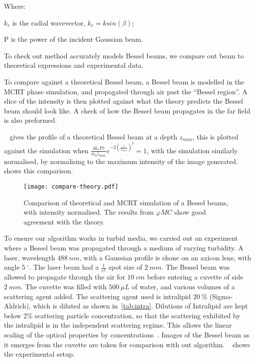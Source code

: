 \noindent Where:

    \indent $k_r$ is the radial wavevector, $k_r=k sin(\beta)$;

    \indent P is the power of the incident Gaussian beam.

    \medskip

To check out method accurately models Bessel beams, we compare out beam to theoretical expressions and experimental data.

To compare against a theoretical Bessel beam, a Bessel beam is modelled in the MCRT phase simulation, and propagated through air past the ``Bessel region''. 
A slice of the intensity is then plotted against what the theory predicts the Bessel beam should look like. 
A check of how the Bessel beam propagates in the far field is also preformed.


~ gives the profile of a theoretical Bessel beam at a depth $z_{max}$, this is plotted against the simulation when $\tfrac{4k_rPz}{w_0z_{max}}e^{-2\left(\tfrac{z}{z_{max}}\right)^2}=1$, with the simulation similarly normalised, by normalising to the maximum intensity of the image generated. ~ shows this comparison.


\begin{figure}[!ht]
    \centering
    \texttt{[image: compare-theory.pdf]}
    \caption{Comparison of theoretical and MCRT simulation of a Bessel beams, with intensity normalised. The results from $\varphi MC$ show good agreement with the theory.}
    \label{fig:besselCompare}
\end{figure}

To ensure our algorithm works in turbid media, we carried out an experiment where a Bessel beam was propagated through a medium of varying turbidity.
A laser, wavelength $488~nm$, with a Gaussian profile is shone on an axicon lens, with angle $5~^{\circ}$.
The laser beam had a $\tfrac{1}{e^2}$ spot size of $2~mm$. 
The Bessel beam was allowed to propagate through the air for $10~cm$ before entering a cuvette of side $2~mm$.
The cuvette was filled with $500~\mu L$ of water, and various volumes of a scattering agent added.
The scattering agent used is intralipid $20~\%$ (Sigma-Aldrich), which is diluted as shown in~\cref{tab:intra}.
Dilutions of Intralipid are kept below 2\% scattering particle concentration, so that the scattering exhibited by the intralipid is in the independent scattering regime.
This allows the linear scaling of the optical properties by concentrations~\cite{aernouts2013supercontinuum,vardaki2015studying,di2011effect}.
Images of the Bessel beam as it emerges from the cuvette are taken for comparison with out algorithm.
~ shows the experimental setup.


